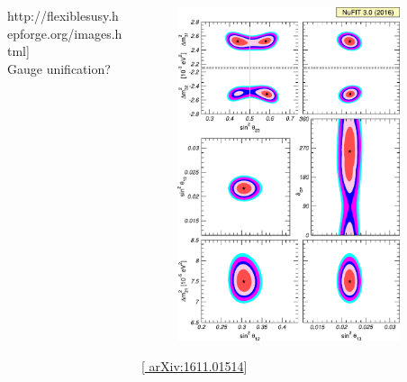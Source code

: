 \documentclass[10pt,aspectratio=169]{beamer}
\begin{document}
\begin{frame}
\begin{columns}[t]
\begin{column}{0.3\textwidth}
\begin{center}
{{        http://flexiblesusy.hepforge.org/images.html}]} \\
        Gauge unification?
      \end{center}
    \end{column}
    \begin{column}{0.7\textwidth}
      \begin{columns}[t]
        \begin{column}{0.5\textwidth}
          \vspace*{-30pt}
          \begin{figure}
            \includegraphics[width=0.9\textwidth]{neutrino_masses} \\
          \end{figure}
          \vspace*{-25pt}
          \begin{center}
            {\tiny [\href{https://arxiv.org/abs/1611.01514}{%
              arXiv:1611.01514}]} \\

\end{center}
\end{column}
\end{columns}
\end{column}
\end{columns}
\end{frame}
\end{document}
